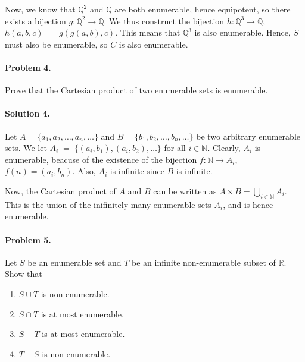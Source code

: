\documentclass[10pt]{article}
\begin{document}
        Now, we know that $\mathbb{Q}^2$ and $\mathbb{Q}$ are both enumerable, hence equipotent, so there exists a bijection
        $g\colon \mathbb{Q}^2 \to \mathbb{Q}$. We thus construct the bijection
        $h\colon \mathbb{Q}^3 \to \mathbb{Q}$, $h(a, b, c) \;=\; g(g(a, b), c)$. This means that $\mathbb{Q}^3$ is also enumerable.
        Hence, $S$ must also be enumerable, so $C$ is also enumerable.

        \paragraph{Problem 4.} Prove that the Cartesian product of two enumerable sets is enumerable.
        \paragraph{Solution 4.} Let $A = \{a_1, a_2, \dots, a_n, \dots\}$ and $B = \{b_1, b_2, \dots, b_n, \dots\}$ be two arbitrary
        enumerable sets.
        We let $A_i \;=\; \{(a_i, b_1), (a_i, b_2), \dots\}$ for all $i \in \mathbb{N}$. Clearly, $A_i$ is enumerable, beacuse of the
        existence of the bijection $f\colon \mathbb{N} \to A_i$, $f(n) = (a_i, b_n)$. Also, $A_i$ is infinite since $B$ is infinite.

        Now, the Cartesian product of $A$ and $B$ can be written as $A\times B = \bigcup_{i\in \mathbb{N}} A_i$. This is the union
        of the inifinitely many enumerable sets $A_i$, and is hence enumerable.

        \paragraph{Problem 5.} Let $S$ be an enumerable set and $T$ be an infinite non-enumerable subset of $\mathbb{R}$. Show that
        \begin{enumerate}
                \item $S\cup T$ is non-enumerable.
                \item $S \cap T$ is at most enumerable.
                \item $S - T$ is at most enumerable.
                \item $T - S$ is non-enumerable.
        \end{enumerate}
\end{document}
